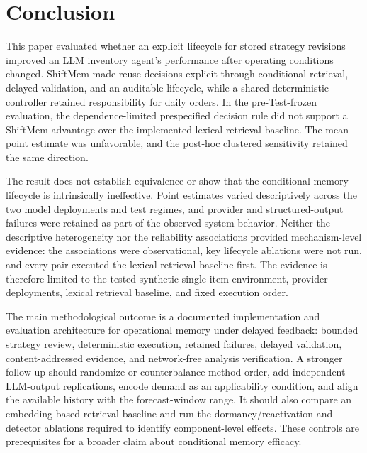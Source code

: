 \section{Conclusion}
\label{sec:conclusion}

This paper evaluated whether an explicit lifecycle for stored strategy revisions
improved an LLM inventory agent's performance after operating conditions
changed.
ShiftMem made reuse decisions explicit through conditional retrieval, delayed
validation, and an auditable lifecycle, while a shared deterministic controller
retained responsibility for daily orders. In the pre-Test-frozen evaluation, the
dependence-limited prespecified decision rule did not support a ShiftMem
advantage over the implemented lexical retrieval baseline. The mean point
estimate was unfavorable, and the post-hoc clustered sensitivity retained the
same direction.

The result does not establish equivalence or show that the conditional memory
lifecycle is intrinsically ineffective. Point estimates varied descriptively
across the two
model deployments and test regimes, and provider and structured-output failures
were retained as part of the observed system behavior. Neither the descriptive
heterogeneity nor the reliability associations provided mechanism-level
evidence: the associations were observational, key lifecycle ablations were not
run, and every pair executed the lexical retrieval baseline first. The evidence
is therefore limited to the tested synthetic single-item environment, provider
deployments, lexical retrieval baseline, and fixed execution order.

The main methodological outcome is a documented implementation and evaluation
architecture for operational memory under delayed feedback: bounded strategy
review, deterministic execution, retained failures, delayed validation,
content-addressed evidence, and network-free analysis verification. A stronger
follow-up should randomize or counterbalance method order, add independent
LLM-output replications, encode
demand as an applicability condition, and align the available history with the
forecast-window range. It should also compare an embedding-based retrieval
baseline and run the dormancy/reactivation and detector ablations required to
identify component-level effects. These controls are prerequisites for a broader
claim about conditional memory efficacy.
